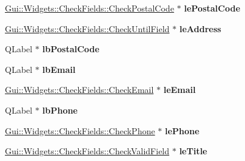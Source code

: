 \begin{DoxyCompactItemize}
\item 
\hypertarget{classUi__UserDataDialog_a7e9bfaf37baf3080bbbdecc0518d9758}{\hyperlink{classGui_1_1Widgets_1_1CheckFields_1_1CheckPostalCode}{Gui\-::\-Widgets\-::\-Check\-Fields\-::\-Check\-Postal\-Code} $\ast$ {\bfseries le\-Postal\-Code}}\label{classUi__UserDataDialog_a7e9bfaf37baf3080bbbdecc0518d9758}

\item 
\hypertarget{classUi__UserDataDialog_ab370a60b8b1b57c1324b8b79d3e21b1c}{\hyperlink{classGui_1_1Widgets_1_1CheckFields_1_1CheckUntilField}{Gui\-::\-Widgets\-::\-Check\-Fields\-::\-Check\-Until\-Field} $\ast$ {\bfseries le\-Address}}\label{classUi__UserDataDialog_ab370a60b8b1b57c1324b8b79d3e21b1c}

\item 
\hypertarget{classUi__UserDataDialog_a9cac50a7981df5159ef33e2d49bd2e75}{Q\-Label $\ast$ {\bfseries lb\-Postal\-Code}}\label{classUi__UserDataDialog_a9cac50a7981df5159ef33e2d49bd2e75}

\item 
\hypertarget{classUi__UserDataDialog_a64b8414316fffde2e2ac3aa1c4fddaf9}{Q\-Label $\ast$ {\bfseries lb\-Email}}\label{classUi__UserDataDialog_a64b8414316fffde2e2ac3aa1c4fddaf9}

\item 
\hypertarget{classUi__UserDataDialog_ac11740a6ff82de9902b783cb13cf2b93}{\hyperlink{classGui_1_1Widgets_1_1CheckFields_1_1CheckEmail}{Gui\-::\-Widgets\-::\-Check\-Fields\-::\-Check\-Email} $\ast$ {\bfseries le\-Email}}\label{classUi__UserDataDialog_ac11740a6ff82de9902b783cb13cf2b93}

\item 
\hypertarget{classUi__UserDataDialog_a823d4f8f7c9275b598a8e8af0ac4d27a}{Q\-Label $\ast$ {\bfseries lb\-Phone}}\label{classUi__UserDataDialog_a823d4f8f7c9275b598a8e8af0ac4d27a}

\item 
\hypertarget{classUi__UserDataDialog_a73bc202cbc121e660fbfcf17462ae123}{\hyperlink{classGui_1_1Widgets_1_1CheckFields_1_1CheckPhone}{Gui\-::\-Widgets\-::\-Check\-Fields\-::\-Check\-Phone} $\ast$ {\bfseries le\-Phone}}\label{classUi__UserDataDialog_a73bc202cbc121e660fbfcf17462ae123}

\item 
\hypertarget{classUi__UserDataDialog_a061982299235ca8a1a16983167c8e023}{\hyperlink{classGui_1_1Widgets_1_1CheckFields_1_1CheckValidField}{Gui\-::\-Widgets\-::\-Check\-Fields\-::\-Check\-Valid\-Field} $\ast$ {\bfseries le\-Title}}\label{classUi__UserDataDialog_a061982299235ca8a1a16983167c8e023}


\end{DoxyCompactItemize}
